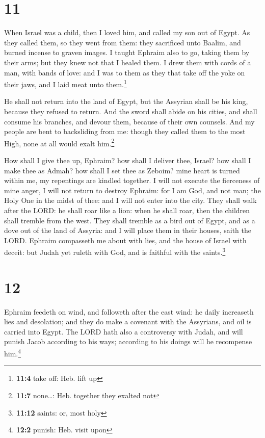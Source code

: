 \hypertarget{section-10}{%
\section{11}\label{section-10}}

 When Israel was a child, then I loved him, and called my
son out of Egypt.  As they called them, so they went from
them: they sacrificed unto Baalim, and burned incense to graven images.
 I taught Ephraim also to go, taking them by their arms;
but they knew not that I healed them.  I drew them with
cords of a man, with bands of love: and I was to them as they that take
off the yoke on their jaws, and I laid meat unto them.\footnote{\textbf{11:4}
  take off: Heb. lift up}

 He shall not return into the land of Egypt, but the
Assyrian shall be his king, because they refused to return.
 And the sword shall abide on his cities, and shall
consume his branches, and devour them, because of their own counsels.
 And my people are bent to backsliding from me: though
they called them to the most High, none at all would exalt
him.\footnote{\textbf{11:7} none\ldots: Heb. together they exalted not}

 How shall I give thee up, Ephraim? how shall I deliver
thee, Israel? how shall I make thee as Admah? how shall I set thee as
Zeboim? mine heart is turned within me, my repentings are kindled
together.  I will not execute the fierceness of mine
anger, I will not return to destroy Ephraim: for I am God, and not man;
the Holy One in the midst of thee: and I will not enter into the city.
 They shall walk after the LORD: he shall roar like a
lion: when he shall roar, then the children shall tremble from the west.
 They shall tremble as a bird out of Egypt, and as a dove
out of the land of Assyria: and I will place them in their houses, saith
the LORD.  Ephraim compasseth me about with lies, and the
house of Israel with deceit: but Judah yet ruleth with God, and is
faithful with the saints.\footnote{\textbf{11:12} saints: or, most holy}

\hypertarget{section-11}{%
\section{12}\label{section-11}}

 Ephraim feedeth on wind, and followeth after the east
wind: he daily increaseth lies and desolation; and they do make a
covenant with the Assyrians, and oil is carried into Egypt.
 The LORD hath also a controversy with Judah, and will
punish Jacob according to his ways; according to his doings will he
recompense him.\footnote{\textbf{12:2} punish: Heb. visit upon}

